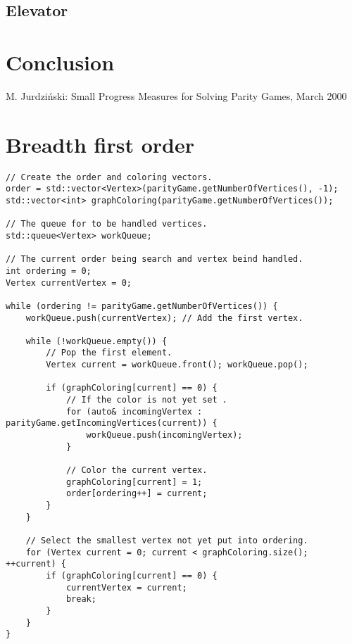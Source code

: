 \documentclass[10pt,a4paper]{article}
\begin{document}
\subsection{Elevator}


\section{Conclusion}\label{conc}


\begin{thebibliography}{9}
 M. Jurdzi\'{n}ski: Small Progress Measures for Solving Parity Games, March 2000
\end{thebibliography}


\newpage
\appendix

\section{Breadth first order}\label{appendix:bfs}

\begin{verbatim}
// Create the order and coloring vectors.
order = std::vector<Vertex>(parityGame.getNumberOfVertices(), -1);
std::vector<int> graphColoring(parityGame.getNumberOfVertices());

// The queue for to be handled vertices.
std::queue<Vertex> workQueue;

// The current order being search and vertex beind handled.
int ordering = 0;
Vertex currentVertex = 0;

while (ordering != parityGame.getNumberOfVertices()) {
	workQueue.push(currentVertex); // Add the first vertex.

    while (!workQueue.empty()) {
    	// Pop the first element.
        Vertex current = workQueue.front(); workQueue.pop();

        if (graphColoring[current] == 0) {
        	// If the color is not yet set .
            for (auto& incomingVertex : parityGame.getIncomingVertices(current)) {
            	workQueue.push(incomingVertex);
            }

            // Color the current vertex.
            graphColoring[current] = 1;
            order[ordering++] = current;
        }
    }

    // Select the smallest vertex not yet put into ordering.
    for (Vertex current = 0; current < graphColoring.size(); ++current) {
    	if (graphColoring[current] == 0) {
        	currentVertex = current;
            break;
        }
    }
}
\end{verbatim}
\end{document}
